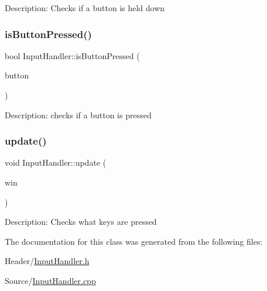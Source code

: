 Description\+: Checks if a button is held down \mbox{\label{class_input_handler_a526e8fcd0c90911813ed189f4337965d}} 
\subsubsection{\texorpdfstring{isButtonPressed()}{isButtonPressed()}}
{\footnotesize\ttfamily bool Input\+Handler\+::is\+Button\+Pressed (\begin{DoxyParamCaption}\item[{std\+::string}]{button }\end{DoxyParamCaption})}

Description\+: checks if a button is pressed \mbox{\label{class_input_handler_a396be11d8d7f45dc3d723bc8096337c1}} 
\subsubsection{\texorpdfstring{update()}{update()}}
{\footnotesize\ttfamily void Input\+Handler\+::update (\begin{DoxyParamCaption}\item[{sf\+::\+Render\+Window \&}]{win }\end{DoxyParamCaption})}

Description\+: Checks what keys are pressed 

The documentation for this class was generated from the following files\+:\begin{DoxyCompactItemize}
\item 
Header/\mbox{\hyperlink{_input_handler_8h}{Input\+Handler.\+h}}\item 
Source/\mbox{\hyperlink{_input_handler_8cpp}{Input\+Handler.\+cpp}}\end{DoxyCompactItemize}
